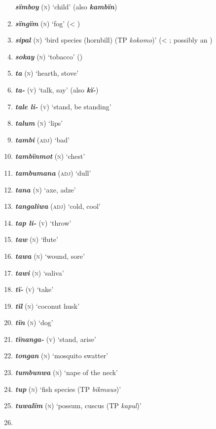 \begin{enumerate}[noitemsep, label={}, align=left, widest=190, labelsep=1ex,leftmargin=*,itemindent=-10pt]
\textbf{\textit{sïmboy}} (\textsc{n}) ‘child’ (also \textbf{\textit{kambïn}}) \item
\textbf{\textit{sïngïm}} (\textsc{n}) ‘fog’ (< ) \item
\textbf{\textit{sipal}} (\textsc{n}) ‘bird species (hornbill) (TP \textit{kokomo})’ (< ; possibly an ) \item
\textbf{\textit{sokay}} (\textsc{n}) ‘tobacco’ () \item
\textbf{\textit{ta}} (\textsc{n}) ‘hearth, stove’ \item
\textbf{\textit{ta-}} (\textsc{v}) ‘talk, say’ (also \textbf{\textit{kï-}}) \item
\textbf{\textit{tale li-}} (\textsc{v)} ‘stand, be standing’ \item
\textbf{\textit{talum}} (\textsc{n}) ‘lips’ \item
\textbf{\textit{tambi}} (\textsc{adj}) ‘bad’ \item
\textbf{\textit{tambïnmot}} (\textsc{n}) ‘chest’ \item
\textbf{\textit{tambumana}} (\textsc{adj}) ‘dull’ \item
\textbf{\textit{tana}} (\textsc{n}) ‘axe, adze’ \item
\textbf{\textit{tangaliwa}} (\textsc{adj}) ‘cold, cool’ \item
\textbf{\textit{tap li-}} (\textsc{v}) ‘throw’ \item
\textbf{\textit{taw}} (\textsc{n}) ‘flute’ \item
\textbf{\textit{tawa}} (\textsc{n}) ‘wound, sore’ \item
\textbf{\textit{tawi}} (\textsc{n}) ‘saliva’ \item
\textbf{\textit{tï-}} (\textsc{v}) ‘take’ \item
\textbf{\textit{tïl}} (\textsc{n}) ‘coconut husk’ \item
\textbf{\textit{tïn}} (\textsc{n}) ‘dog’ \item
\textbf{\textit{tïnanga-}} (\textsc{v}) ‘stand, arise’ \item
\textbf{\textit{tongan}} (\textsc{n}) ‘mosquito swatter’ \item
\textbf{\textit{tumbunwa}} (\textsc{n}) ‘nape of the neck’ \item
\textbf{\textit{tup}} (\textsc{n}) ‘fish species (TP \textit{bikmaus})’ \item
\textbf{\textit{tuwalïm}} (\textsc{n}) ‘possum, cuscus (TP \textit{kapul})’ \item

\end{enumerate}

